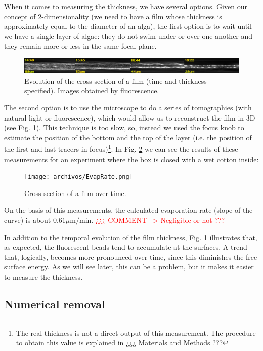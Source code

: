 When it comes to measuring the thickness, we have several options. Given our concept of 2-dimensionality (we need to have a film whose thickness is approximately equal to the diameter of an alga), the first option is to wait until we have a single layer of algae: they do not swim under or over one another and they remain more or less in the same focal plane.

\begin{figure}[H]
	\centering
	\includegraphics[width=\textwidth]{archivos/ThicknessEvolution.png}
	\caption{Evolution of the cross section of a film (time and thickness specified). Images obtained by fluorescence.}
	\label{thickness}
\end{figure}

The second option is to use the microscope to do a series of tomographies (with natural light or fluorescence), which would allow us to reconstruct the film in 3D (see Fig. \ref{thickness}). This technique is too slow, so, instead we used the focus knob to estimate the position of the bottom and the top of the layer (i.e. the position of the first and last tracers in focus)\footnote{The real thickness is not a direct output of this measurement. The procedure to obtain this value is explained in ¿¿¿ Materials and Methods ???}. In Fig. \ref{evap_rate} we can see the results of these measurements for an experiment where the box is closed with a wet cotton inside:

\begin{figure}[H]
	\centering
	\texttt{[image: archivos/EvapRate.png]}
	\caption{Cross section of a film over time.}
	\label{evap_rate}
\end{figure}

On the basis of this measurements, the calculated evaporation rate (slope of the curve) is about $ 0.61 \mu \textrm{m/min}$. \textcolor{red}{¿¿¿ COMMENT --> Negligible or not ???}

In addition to the temporal evolution of the film thickness, Fig. \ref{thickness} illustrates that, as expected, the fluorescent beads tend to accumulate at the surfaces. A trend that, logically, becomes more pronounced over time, since this diminishes the free surface energy. As we will see later, this can be a problem, but it makes it easier to measure the thickness.

\subsection{Numerical removal}

